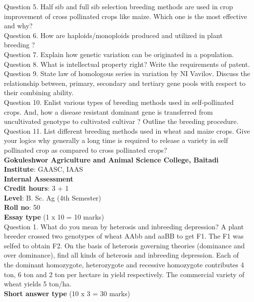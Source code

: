 \documentclass[12pt]{article}\usepackage[]{graphicx}\usepackage[]{color}
\begin{document}
Question 5. Half sib and full sib selection breeding methods are used in crop improvement of cross pollinated crops like maize. Which one is the most effective and why?\\
Question 6. How are haploids/monoploids produced and utilized in plant breeding ?\\
Question 7. Explain how genetic variation can be originated in a population.\\
Question 8. What is intellectual property right? Write the requirements of patent.\\
Question 9. State law of homologous series in variation by NI Vavilov. Discuss the relationship between, primary, secondary and tertiary gene pools with respect to their combining ability.\\
Question 10. Enlist various types of breeding methods used in self-pollinated crops. And, how a disease resistant dominant gene is transferred from uncultivated genotype to cultivated cultivar ? Outline the breeding procedure.\\
Question 11. List different breeding methods used in wheat and maize crops. Give your logics why generally a long time is required to release a variety in self pollinated crop as compared to cross pollinated crops?\\
\clearpage 
{\centering \Large{\textbf{Gokuleshwor Agriculture and Animal Science College, Baitadi}} \\[0.25cm]
            \textbf{Institute}: GAASC, IAAS \\[0.2cm]
            \textbf{Internal Assessment} \\[0.2cm]} 
\textbf{Credit hours}: 3 + 1 \\ 
\textbf{Level}: B. Sc. Ag (4th Semester) \\
\textbf{Roll no}: 50 \\[0.5cm] 
\textbf{Essay type} (1 x 10 = 10 marks) \\
Question 1. What do you mean by heterosis and inbreeding depression? A plant breeder crossed two genotypes of wheat AAbb and aaBB to get F1. The F1 was selfed to obtain F2. On the basis of heterosis governing theories (dominance and over dominance), find all kinds of heterosis and inbreeding depression. Each of the dominant homozygote, heterozygote and recessive homozygote contributes 4 ton, 6 ton and 2 ton per hectare in yield respectively. The commercial variety of wheat yields 5 ton/ha.\\
\textbf{Short answer type} (10 x 3 = 30 marks) \\
\end{document}

